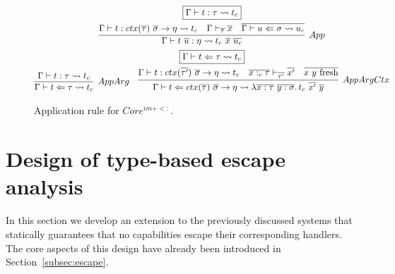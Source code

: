 \documentclass[acmsmall]{acmart}
\newcommand{\mathframebox}[1]{\framebox{$\displaystyle #1$}}
\newcommand{\ap}{~}
\newcommand{\step}{\rightsquigarrow}
\begin{document}
\begin{figure}
    \begin{gather*}
        \mathframebox{\Gamma\vdash t : \tau \step t_c} \\
        \infer[App]{
            \Gamma\vdash t\ap\overline{u} : \eta \step t_c \ap \overline{x} \ap \overline{u_c}
        }{
            \Gamma\vdash t : ctx(\overline{\tau})~\overline{\sigma}\to \eta \step t_c
            &
            \Gamma \vdash_{\overline{\tau}} \overline{x}
            &
            \overline{\Gamma\vdash u \Leftarrow \sigma \step u_c}
        } \\
        \mathframebox{\Gamma\vdash t \Leftarrow \tau \step t_c} \\
        \infer[AppArg]{
            \Gamma\vdash t \Leftarrow \tau \step t_c
        }{
            \Gamma\vdash t : \tau \step t_c
        }
        \text{\hspace{1em}}
        \infer[AppArgCtx]{
            \Gamma \vdash t \Leftarrow ctx(\overline{\tau}) ~\overline{\sigma}\to\eta\step \lambda \overline{x : \tau}~\overline{y : \sigma}\ldotp t_c\ap \overline{x'}\ap\overline{y}
        }{
            \Gamma \vdash t : ctx(\overline{\tau'}) ~\overline{\sigma}\to\eta \step t_c
            &
            \overline{x :_c \tau} \vdash_{\overline{\tau'}} \overline{x'}
            &
            \overline{x~y \text{ fresh}}
        }
    \end{gather*}
    \caption{Application rule for $Core^{im + <:}$.}
    \label{sig:fim-sub-app}
\end{figure}





\section{Design of type-based escape analysis} \label{sec:escape}

In this section we develop an extension to the previously discussed systems that statically guarantees that no capabilities escape their corresponding handlers.
The core aspects of this design have already been introduced in Section~\ref{subsec:escape}.
\end{document}
